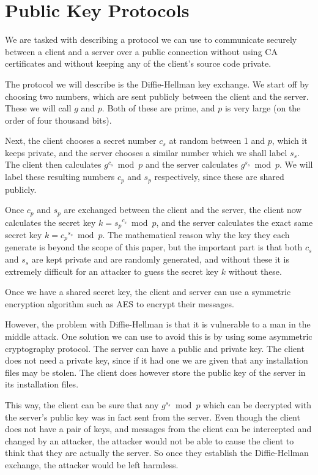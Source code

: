 \documentclass{article}
\begin{document}
\section{Public Key Protocols}

We are tasked with describing a protocol we can use to communicate securely between a client and a server over a public connection without using CA certificates and without keeping any of the client's source code private.

The protocol we will describe is the Diffie-Hellman key exchange. We start off by choosing two numbers, which are sent publicly between the client and the server. These we will call \(g\) and \(p\). Both of these are prime, and \(p\) is very large (on the order of four thousand bits).

Next, the client chooses a secret number \(c_s\) at random between 1 and \(p\), which it keeps private, and the server chooses a similar number which we shall label \(s_s\). The client then calculates \(g^{c_s} \bmod p\) and the server calculates \(g^{s_s} \bmod p\). We will label these resulting numbers \(c_p\) and \(s_p\) respectively, since these are shared publicly.

Once \(c_p\) and \(s_p\) are exchanged between the client and the server, the client now calculates the secret key \(k = {s_p}^{c_s} \bmod p\), and the server calculates the exact same secret key \(k = {c_p}^{s_s} \bmod p\). The mathematical reason why the key they each generate is beyond the scope of this paper, but the important part is that both \(c_s\) and \(s_s\) are kept private and are randomly generated, and without these it is extremely difficult for an attacker to guess the secret key \(k\) without these.

Once we have a shared secret key, the client and server can use a symmetric encryption algorithm such as AES to encrypt their messages.

However, the problem with Diffie-Hellman is that it is vulnerable to a man in the middle attack. One solution we can use to avoid this is by using some asymmetric cryptography protocol. The server can have a public and private key. The client does not need a private key, since if it had one we are given that any installation files may be stolen. The client does however store the public key of the server in its installation files.

This way, the client can be sure that any \(g^{s_s} \bmod p\) which can be decrypted with the server's public key was in fact sent from the server. Even though the client does not have a pair of keys, and messages from the client can be intercepted and changed by an attacker, the attacker would not be able to cause the client to think that they are actually the server. So once they establish the Diffie-Hellman exchange, the attacker would be left harmless.
\end{document}
